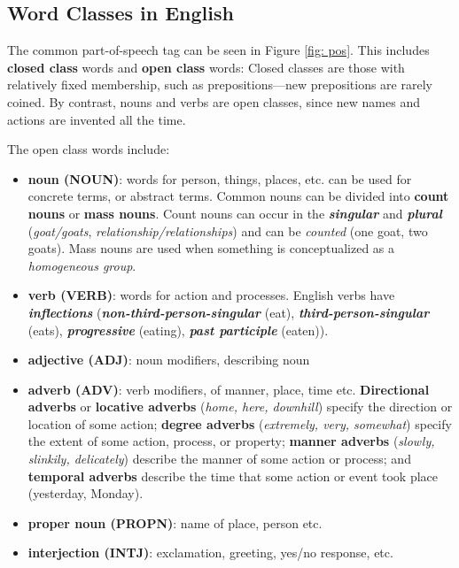\documentclass[11pt]{article}
\begin{document}
\subsection{Word Classes in English}
The common part-of-speech tag can be seen in Figure \ref{fig: pos}. This includes \textbf{closed class} words and \textbf{open class} words: Closed classes are those with relatively fixed membership, such as prepositions—new prepositions are rarely coined. By contrast, nouns and verbs are open classes, since new names and actions are invented all the time. 

The open class words include:
\begin{itemize}
\item \textbf{noun (NOUN)}: words for person, things, places, etc. can be used for concrete terms, or abstract terms. Common nouns can be divided into \textbf{count nouns} or \textbf{mass nouns}. Count nouns can occur in the \emph{\textbf{singular}} and \emph{\textbf{plural}} (\emph{goat/goats}, \emph{relationship/relationships}) and can be \emph{counted} (one goat, two goats). Mass nouns are used when something is conceptualized as a \emph{homogeneous group}.
\item \textbf{verb (VERB)}: words for action and processes. English verbs have \emph{\textbf{inflections}} (\emph{\textbf{non-third-person-singular}} (eat), \textit{\textbf{third-person-singular}} (eats), \emph{\textbf{progressive}} (eating), \emph{\textbf{past participle}} (eaten)).
\item \textbf{adjective (ADJ)}: noun modifiers, describing noun
\item \textbf{adverb (ADV)}: verb modifiers, of manner, place, time etc. \textbf{Directional adverbs} or \textbf{locative adverbs} (\emph{home, here, downhill}) specify the direction or location of some action; \textbf{degree adverbs} (\emph{extremely, very, somewhat}) specify the extent of some action, process, or property; \textbf{manner adverbs} (\emph{slowly, slinkily, delicately}) describe the manner of some action or process; and \textbf{temporal adverbs} describe the time that some action or event
took place (yesterday, Monday).
\item \textbf{proper noun (PROPN)}: name of place, person etc. 
\item \textbf{interjection (INTJ)}: exclamation, greeting, yes/no response, etc. 
\end{itemize}
\end{document}
